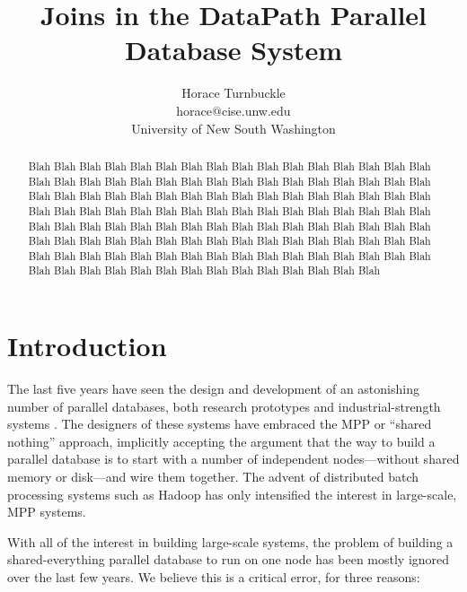 \documentclass{sig-alternate}
\title{Joins in the DataPath Parallel Database System}
\author{Horace Turnbuckle\\
horace$@$cise.unw.edu \\
University of New South Washington
             }
\renewcommand\:{\colon} %
\begin{document}
\maketitle


\begin{abstract}
Blah Blah Blah Blah Blah Blah Blah Blah Blah Blah Blah Blah Blah Blah  
Blah Blah Blah Blah Blah Blah Blah Blah Blah Blah Blah Blah Blah Blah  
Blah Blah Blah Blah Blah Blah Blah Blah Blah Blah Blah Blah Blah Blah  
Blah Blah Blah Blah Blah Blah Blah Blah Blah Blah Blah Blah Blah Blah  
Blah Blah Blah Blah Blah Blah Blah Blah Blah Blah Blah Blah Blah Blah  
Blah Blah Blah Blah Blah Blah Blah Blah Blah Blah Blah Blah Blah Blah  
Blah Blah Blah Blah Blah Blah Blah Blah Blah Blah Blah Blah Blah Blah  
Blah Blah Blah Blah Blah Blah Blah Blah Blah Blah Blah Blah Blah Blah  
Blah Blah Blah Blah Blah Blah Blah Blah Blah Blah Blah Blah Blah Blah  
\end{abstract}

\section{Introduction}

The last five years have seen the design and development of an astonishing number of parallel databases, 
both research prototypes and industrial-strength systems \cite{}.  The designers of these systems have embraced the MPP 
or ``shared nothing''
approach, implicitly accepting the argument that the way to build a parallel database is to start with a number of
independent nodes---without shared memory or disk---and wire them together.
The advent of distributed batch processing systems such as Hadoop 
has only intensified the interest in large-scale, MPP systems. 

With all of the interest in building large-scale systems, the problem of building a shared-everything
parallel database to run
on one node has been mostly ignored over the last few years.  
We believe this is a critical error, for three reasons:
\end{document}
